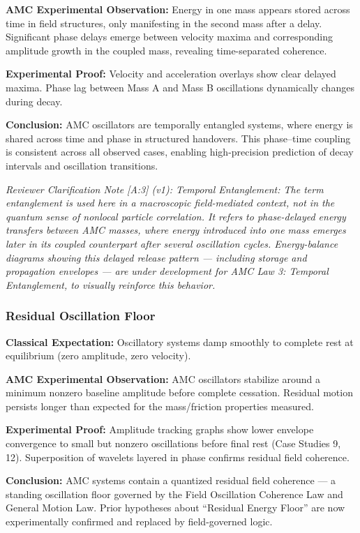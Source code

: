 \documentclass[10pt,aps,pre,onecolumn,superscriptaddress,notitlepage]{revtex4-2}
\begin{document}
\textbf{AMC Experimental Observation:} Energy in one mass appears stored across time in field structures, only manifesting in the second mass after a delay. Significant phase delays emerge between velocity maxima and corresponding amplitude growth in the coupled mass, revealing time-separated coherence.

\textbf{Experimental Proof:} Velocity and acceleration overlays show clear delayed maxima. Phase lag between Mass A and Mass B oscillations dynamically changes during decay.

\textbf{Conclusion:} AMC oscillators are temporally entangled systems, where energy is shared across time and phase in structured handovers. This phase–time coupling is consistent across all observed cases, enabling high-precision prediction of decay intervals and oscillation transitions.

\textit{Reviewer Clarification Note [A:3] (v1): Temporal Entanglement: The term entanglement is used here in a macroscopic field-mediated context, not in the quantum sense of nonlocal particle correlation. It refers to phase-delayed energy transfers between AMC masses, where energy introduced into one mass emerges later in its coupled counterpart after several oscillation cycles. Energy-balance diagrams showing this delayed release pattern — including storage and propagation envelopes — are under development for AMC Law 3: Temporal Entanglement, to visually reinforce this behavior.}

\subsubsection{Residual Oscillation Floor}
\label{sec:dev4ResidualOscillationFloor}
\textbf{Classical Expectation:} Oscillatory systems damp smoothly to complete rest at equilibrium (zero amplitude, zero velocity).

\textbf{AMC Experimental Observation:} AMC oscillators stabilize around a minimum nonzero baseline amplitude before complete cessation. Residual motion persists longer than expected for the mass/friction properties measured.

\textbf{Experimental Proof:} Amplitude tracking graphs show lower envelope convergence to small but nonzero oscillations before final rest (Case Studies 9, 12). Superposition of wavelets layered in phase confirms residual field coherence.

\noindent \textbf{Conclusion:} AMC systems contain a quantized residual field coherence — a standing oscillation floor governed by the Field Oscillation Coherence Law and General Motion Law. Prior hypotheses about ``Residual Energy Floor'' are now experimentally confirmed and replaced by field-governed logic.
\end{document}

